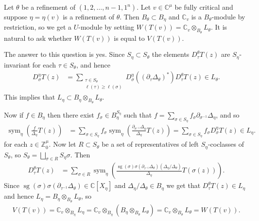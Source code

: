 \documentclass[11pt,fleqn]{article}
\newcommand\CC{\mathbb C}
\newcommand\ZZ{\mathbb Z}
\newcommand\ot{\otimes}
\DeclareMathOperator\sym{sym}
\DeclareMathOperator\sg{sg}
\begin{document}
\begin{Remark}
Let $\theta$ be a refinement of $(1,2, \ldots, n-1, 1^n)$.
Let $v \in \CC^\mu$ be fully critical and suppose $\eta = \eta(v)$ is
a refinement of $\theta$. Then $B_\theta \subset B_\eta$ and $\CC_v$ is a 
$B_\theta$-module by restriction, so we get a $U$-module by setting $W(T(v))
= \CC_v \ot_{B_\theta} L_\theta$. It is natural to ask whether $W(T(v))$ is 
equal to $V(T(v))$. 

The answer to this question is yes. Since $S_\eta \subset S_\theta$ the 
elements $D^\theta_\tau T(z)$ are $S_\eta$-invariant for each $\tau \in 
S_\theta$, and hence
\begin{align*}
D_\sigma^\eta T(z)
  &= \sum_{\substack{\tau \in S_\theta\\ \ell(\tau) \geq \ell(\sigma)}}
    D_\sigma^\eta ((\partial_\tau \Delta_\theta)^*) D_\tau^\theta T(z)
    \in L_\theta.
\end{align*} 
This implies that $L_\eta \subset B_\eta \ot_{B_\theta} L_\theta$.

Now if $f \in B_\eta$ then there exist $f_\sigma \in B_\eta^{S_\eta}$
such that $f = \sum_{\sigma \in S_\eta} f_\sigma \partial_{\sigma^{-1}}
\Delta_\eta$, and so
\begin{align*}
\sym_\eta \left( \frac{f}{\Delta_\eta} T(z)\right)
  &= \sum_{\sigma \in S_\eta} f_\sigma \sym_\eta \left( 
    \frac{\partial_{\sigma^{-1}} \Delta_\eta}{\Delta_\eta} T(z)
  \right)
  = \sum_{\sigma \in S_\eta} f_\sigma D_\sigma^\eta T(z) \in L_\eta.  
\end{align*}
for each $z \in \ZZ^\mu_0$. Now let $R \subset S_\theta$ be a set of 
representatives of left $S_\eta$-coclasses of $S_\theta$, so $S_\theta
= \bigsqcup_{\sigma \in R} S_\eta \sigma$. Then
\begin{align*}
D_\tau^\theta T(z)
  &= \sum_{\sigma \in R} \sym_\eta \left(
    \frac{\sg(\sigma) \sigma(\partial_{\tau^{-1}} \Delta_\theta)
      (\Delta_\eta/\Delta_\theta)}
    {\Delta_\eta} T(\sigma(z))
  \right).
\end{align*}
Since $\sg(\sigma) \sigma(\partial_{\tau^{-1}} \Delta_\theta) \in \CC[X_\eta]$ 
and $\Delta_\eta/\Delta_\theta \in B_\eta$ we get that $D_\tau^\theta T(z) \in 
L_\eta$ and hence $L_\eta = B_\eta \ot_{B_\theta} L_\theta$, so
\begin{align*}
V(T(v)) 
  = \CC_v \ot_{B_\eta} L_\eta 
  = \CC_v \ot_{B_\eta} (B_\eta \ot_{B_\theta} L_\theta)
  = \CC_v \ot_{B_\theta} L_\theta
  = W(T(v)).
\end{align*}
\end{Remark}

\begin{bibdiv}
\begin{biblist}
\end{biblist}
\end{bibdiv}
\end{document}
